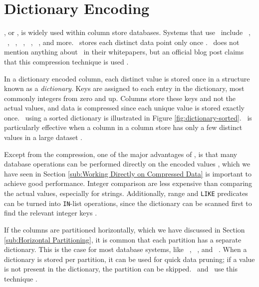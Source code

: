 \section{Dictionary Encoding}
\label{sec:Dictionary Encoding}
\de, or , is widely used within column store databases. Systems that use \de~include \oracle~\cite{Lahiri2015-mz}, \ibm~\cite{Raman2013-em}, \saph~\cite{Farber2012-vh}, \sapnw~\cite{Lemke2010-is}, \blink~\cite{Johnson2008-cp}, \mssql~\cite{Larson2013-mc}, and more. \qlikview~stores each distinct data point only once \cite{Qlik2011-ef}. \tableau~does not mention anything about \de~in their whitepapers, but an official blog post claims that this compression technique is used \cite{noauthor_undated-us}.


In a dictionary encoded column, each distinct value is stored once in a structure known as a \textit{dictionary}. Keys are assigned to each entry in the dictionary, most commonly integers from zero and up. Columns store these keys and not the actual values, and data is compressed since each unique value is stored exactly once. \de~using a sorted dictionary is illustrated in Figure \ref{fig:dictionary-sorted}. \de~is particularly effective when a column in a column store has only a few distinct values in a large dataset \cite{Faust2015-ke}.


Except from the compression, one of the major advantages of \de, is that many database operations can be performed directly on the encoded values \cite{Faust2015-ke}, which we have seen in Section \ref{sub:Working Directly on Compressed Data} is important to achieve good performance. Integer comparison are less expensive than comparing the actual values, especially for strings. Additionally, range and \texttt{LIKE} predicates can be turned into \texttt{IN}-list operations, since the dictionary can be scanned first to find the relevant integer keys \cite{Barber2012-xt}.

If the columns are partitioned horizontally, which we have discussed in Section \ref{sub:Horizontal Partitioning}, it is common that each partition has a separate dictionary. This is the case for most database systems, like \oracle~\cite{Lahiri2015-mz}, \blink~\cite{Barber2012-xt}, and \mssql~\cite{Larson2013-mc}. When a dictionary is stored per partition, it can be used for quick data pruning; if a value is not present in the dictionary, the partition can be skipped. \blink~and \monetx~use this technique \cite{Barber2012-xt, Boncz2005-wj}. 

